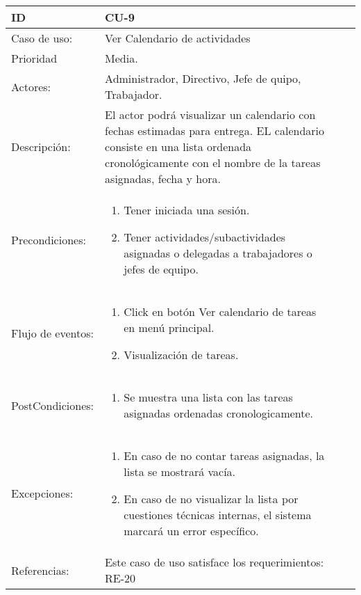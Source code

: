 \documentclass[11pt,a4paper]{article}
\begin{document}
\begin{tabular}[c]{|p{3cm}|p{13cm}|p{2.5cm}|p{3cm}|}
\hline 
\rule[-1ex]{0pt}{2.5ex} ID & CU-9 \\ 
\hline 
\rule[-1ex]{0pt}{2.5ex} Caso de uso: & Ver Calendario de actividades \\ 
\hline 
\rule[-1ex]{0pt}{2.5ex} Prioridad & Media. \\ 
\hline 
\rule[-1ex]{0pt}{2.5ex} Actores: & Administrador, Directivo, Jefe de quipo, Trabajador.\\ 
\hline 
\rule[-1ex]{0pt}{2.5ex} Descripción: & El actor podrá visualizar un calendario con fechas estimadas para entrega. EL calendario
consiste en una lista ordenada cronológicamente con el nombre de la tareas asignadas, fecha y hora. \\ 
\hline 
\rule[-1ex]{0pt}{2.5ex}Precondiciones: & \begin{enumerate}
\item Tener iniciada una sesión.
\item Tener actividades/subactividades asignadas o delegadas a trabajadores o jefes de equipo.
\end{enumerate} \\ 
\hline 
\rule[-1ex]{0pt}{2.5ex} Flujo de eventos: & \begin{enumerate} 
\item Click en botón Ver calendario de tareas en menú principal.
\item Visualización de tareas.
\end{enumerate}
\\ 
\hline 
\rule[-1ex]{0pt}{2.5ex} PostCondiciones:& \begin{enumerate}  
\item Se muestra una lista con las tareas asignadas ordenadas cronologicamente.
\end{enumerate} \\ 
\hline 
\rule[-1ex]{0pt}{2.5ex} Excepciones: & \begin{enumerate} 
\item En caso de no contar tareas asignadas, la lista se mostrará vacía.

\item En caso de no visualizar la lista por cuestiones técnicas internas, el sistema marcará un error específico.
\end{enumerate} \\ 
\hline 
\rule[-1ex]{0pt}{2.5ex} Referencias: & Este caso de uso satisface los requerimientos: RE-20\\
\hline 

\end{tabular} 
\end{document}
